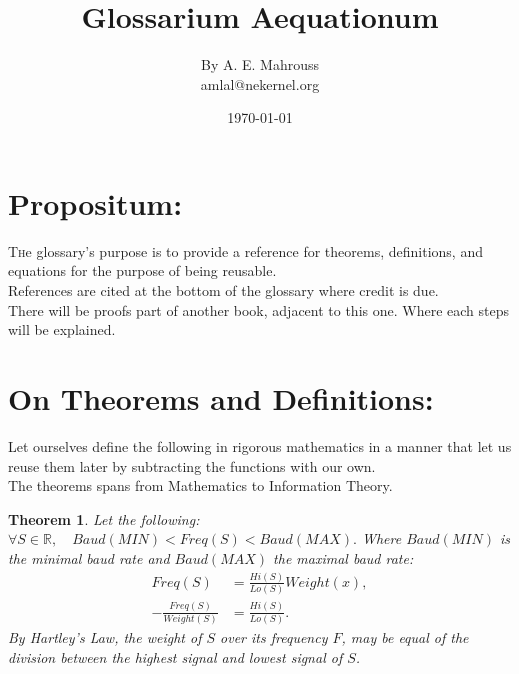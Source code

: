 \documentclass[10pt]{article}
\title{%
	\vspace{-1.5em}%
	\large\textbf{Glossarium Aequationum}%
}
\author{By A. E. Mahrouss\\amlal@nekernel.org}
\date{\today}
\theoremstyle{plain}
\newtheorem{theorem}{Theorem}[section]
\theoremstyle{definition}
\theoremstyle{remark}
\begin{document}

\maketitle
\tableofcontents
\newpage

\section{Propositum:}

\lettrine[lines=2, lhang=0.1, loversize=0.2]{T}he glossary's purpose is to provide a reference for theorems, definitions, and equations for the purpose of being reusable.\\
References are cited at the bottom of the glossary where credit is due.\\
There will be proofs part of another book, adjacent to this one. Where each steps will be explained.

\section{On Theorems and Definitions:}

Let ourselves define the following in rigorous mathematics in a manner that let us reuse them later by subtracting the functions with our own.\\
The theorems spans from Mathematics to Information Theory. 

\begin{theorem}
Let the following:
$\forall S \in \mathbb{R}, \quad Baud(MIN) < Freq(S) < Baud(MAX).$ Where $Baud(MIN)$ is the minimal baud rate and $Baud(MAX)$ the maximal baud rate:
\begin{align*}
	Freq(S) &= \frac{Hi(S)}{Lo(S)} Weight(x),\\
	-\frac{Freq(S)}{Weight(S)} &= \frac{Hi(S)}{Lo(S)}.
\end{align*}
By Hartley's Law, the weight of $S$ over its frequency $F$, may be equal of the division between the highest signal and lowest signal of $S$.
\end{theorem}
\end{document}
